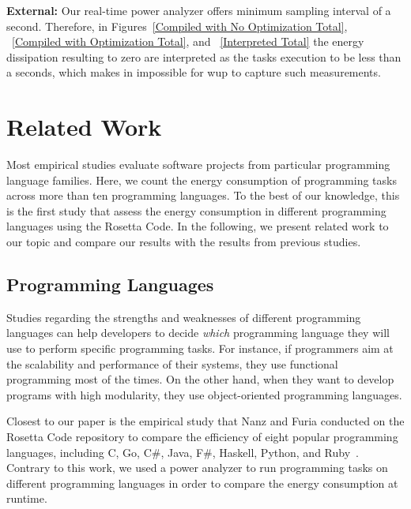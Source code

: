\noindent\textbf{External:} Our real-time power analyzer offers 
minimum sampling interval of a second. 
Therefore, in Figures~\ref{Compiled with No Optimization Total}, 
~\ref{Compiled with Optimization Total}, and ~\ref{Interpreted Total}  
the energy dissipation resulting to zero are interpreted 
as the tasks execution to be less than a seconds, which makes in 
impossible for {\sc wup} to capture such measurements. 


\section{Related Work} \label{related_work}
Most empirical studies evaluate software projects
from particular programming language families.
Here, we count the energy consumption of programming tasks across 
more than ten programming languages.
To the best of our knowledge, this is the first study that assess
the energy consumption in different programming languages using 
the Rosetta Code.
In the following, we present related work to our topic and compare 
our results with the results from previous studies.

\subsection{Programming Languages}
Studies regarding the strengths and weaknesses of different 
programming languages can help developers to decide {\it which} 
programming language they will use to perform specific 
programming tasks.
For instance, if programmers aim at the scalability and performance 
of their systems, they use functional programming most of the 
times.
On the other hand, when they want to develop programs with high 
modularity, they use object-oriented programming languages.

Closest to our paper is the empirical study that Nanz and Furia
conducted on the Rosetta Code repository to compare the efficiency 
of eight popular programming languages, including C, Go, C\#, Java, 
F\#, Haskell, Python, and  Ruby~\cite{NF15}.
Contrary to this work, we used a power analyzer to run programming 
tasks on different programming languages in order to compare the 
energy consumption at runtime.

